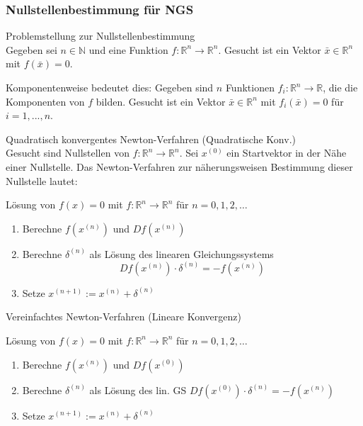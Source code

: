 \raggedcolumns

\subsubsection{Nullstellenbestimmung für NGS}

\begin{definition}{Problemstellung zur Nullstellenbestimmung}\\
Gegeben sei $n \in \mathbb{N}$ und eine Funktion $f: \mathbb{R}^n \rightarrow \mathbb{R}^n$. Gesucht ist ein Vektor $\bar{x} \in \mathbb{R}^n$ mit $f(\bar{x}) = 0$.

Komponentenweise bedeutet dies: Gegeben sind $n$ Funktionen $f_i: \mathbb{R}^n \rightarrow \mathbb{R}$, die die Komponenten von $f$ bilden. Gesucht ist ein Vektor $\bar{x} \in \mathbb{R}^n$ mit $f_i(\bar{x}) = 0$ für $i = 1, ..., n$.
\end{definition}

\begin{concept}{Quadratisch konvergentes Newton-Verfahren} \small{(Quadratische Konv.)}\\
    \normalsize
    Gesucht sind Nullstellen von $f: \mathbb{R}^n \rightarrow \mathbb{R}^n$. Sei $x^{(0)}$ ein Startvektor in der Nähe einer Nullstelle. 
    Das Newton-Verfahren zur näherungsweisen Bestimmung dieser Nullstelle lautet:

    Lösung von $f(x)=0$ mit $f: \mathbb{R}^n \rightarrow \mathbb{R}^n$ für $n=0,1,2, \ldots$
    \begin{enumerate}
        \item Berechne $f(x^{(n)})$ und $D f(x^{(n)})$
        \item Berechne $\delta^{(n)}$ als Lösung des linearen Gleichungssystems
        $$Df(x^{(n)}) \cdot \delta^{(n)} = -f(x^{(n)})$$
        \item Setze $x^{(n+1)} := x^{(n)} + \delta^{(n)}$
    \end{enumerate}
\end{concept}

\begin{theorem}{Vereinfachtes Newton-Verfahren} (Lineare Konvergenz)

    Lösung von $f(x)=0$ mit $f: \mathbb{R}^n \rightarrow \mathbb{R}^n$ für $n=0,1,2, \ldots$
    \begin{enumerate}
        \item Berechne $f(x^{(n)})$ und $D f(x^{(0)})$
        \item Berechne $\delta^{(n)}$ als Lösung des lin. GS $D f\left(x^{(0)}\right) \cdot \delta^{(n)}=-f\left(x^{(n)}\right)$
        \item Setze $x^{(n+1)}:=x^{(n)}+\delta^{(n)}$
    \end{enumerate}
\end{theorem}

